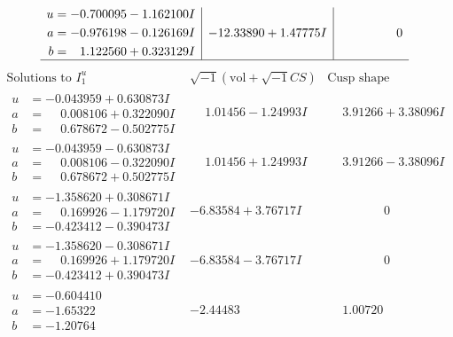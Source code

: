 \documentclass[1p]{elsarticle_modified}
\theoremstyle{definition}
\newcommand{\I}{\sqrt{-1}}
\begin{document}
$$\begin{array}{c|c|c}
\begin{aligned}
u &= -0.700095 - 1.162100 I \\
a &= -0.976198 - 0.126169 I \\
b &= \phantom{-}1.122560 + 0.323129 I\end{aligned}
 & -12.33890 + 1.47775 I & \phantom{-0.000000 } 0\\
 \hline 
 \end{array}$$\newpage$$\begin{array}{c|c|c}  
\text{Solutions to }I^u_{1}& \I (\text{vol} + \sqrt{-1}CS) & \text{Cusp shape}\\
 \hline 
\begin{aligned}
u &= -0.043959 + 0.630873 I \\
a &= \phantom{-}0.008106 + 0.322090 I \\
b &= \phantom{-}0.678672 - 0.502775 I\end{aligned}
 & \phantom{-}1.01456 - 1.24993 I & \phantom{-}3.91266 + 3.38096 I \\ \hline\begin{aligned}
u &= -0.043959 - 0.630873 I \\
a &= \phantom{-}0.008106 - 0.322090 I \\
b &= \phantom{-}0.678672 + 0.502775 I\end{aligned}
 & \phantom{-}1.01456 + 1.24993 I & \phantom{-}3.91266 - 3.38096 I \\ \hline\begin{aligned}
u &= -1.358620 + 0.308671 I \\
a &= \phantom{-}0.169926 - 1.179720 I \\
b &= -0.423412 - 0.390473 I\end{aligned}
 & -6.83584 + 3.76717 I & \phantom{-0.000000 } 0 \\ \hline\begin{aligned}
u &= -1.358620 - 0.308671 I \\
a &= \phantom{-}0.169926 + 1.179720 I \\
b &= -0.423412 + 0.390473 I\end{aligned}
 & -6.83584 - 3.76717 I & \phantom{-0.000000 } 0 \\ \hline\begin{aligned}
u &= -0.604410\phantom{ +0.000000I} \\
a &= -1.65322\phantom{ +0.000000I} \\
b &= -1.20764\phantom{ +0.000000I}\end{aligned}
 & -2.44483\phantom{ +0.000000I} & \phantom{-}1.00720\phantom{ +0.000000I} \\ \hline\begin{aligned}

\end{aligned}
\end{array}$$
\end{document}
